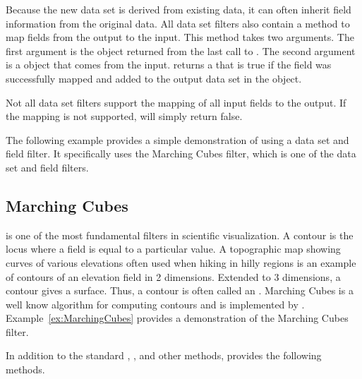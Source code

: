 Because the new data set is derived from existing data, it can often
inherit field information from the original data. All data set filters also
contain a  method to map fields from the
output to the input. This method takes two arguments. The first argument is
the  object returned from the last call to
. The second argument is a  object that
comes from the input.  returns a
 that is true if the field was successfully mapped and added
to the output data set in the  object.

\begin{commonerrors}
  Not all data set filters support the mapping of all input fields to the
  output. If the mapping is not supported, 
  will simply return false.
\end{commonerrors}

The following example provides a simple demonstration of using a data set
and field filter. It specifically uses the Marching Cubes filter, which is
one of the data set and field filters.


\subsection{Marching Cubes}


 is one of the most fundamental filters in scientific
visualization. A contour is the locus where a field is equal to a
particular value. A topographic map showing curves of various elevations
often used when hiking in hilly regions is an example of contours of an
elevation field in 2 dimensions. Extended to 3 dimensions, a contour gives
a surface. Thus, a contour is often called an .
Marching Cubes is a well know algorithm for computing contours and is
implemented by . Example~\ref{ex:MarchingCubes}
provides a demonstration of the Marching Cubes filter.

In addition to the standard ,
, and other methods,
 provides the following methods.

